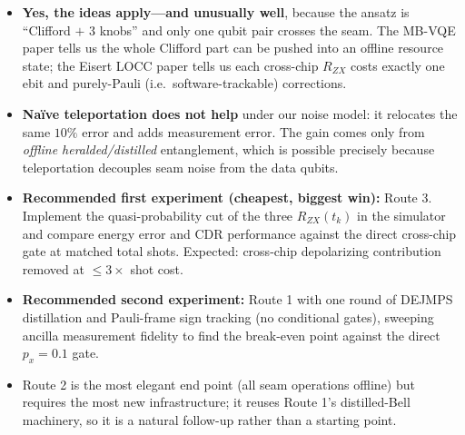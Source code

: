 \documentclass[11pt]{article}
\newcommand{\RZX}{R_{ZX}}
\begin{document}
\begin{itemize}[leftmargin=2em]
  \item \textbf{Yes, the ideas apply---and unusually well}, because the ansatz
        is ``Clifford $+$ 3 knobs'' and only one qubit pair crosses the seam.
        The MB-VQE paper tells us the whole Clifford part can be pushed into
        an offline resource state; the Eisert LOCC paper tells us each
        cross-chip $\RZX$ costs exactly one ebit and purely-Pauli
        (i.e.\ software-trackable) corrections.
  \item \textbf{Na\"ive teleportation does not help} under our noise model:
        it relocates the same $10\%$ error and adds measurement error. The
        gain comes only from \emph{offline heralded/distilled} entanglement,
        which is possible precisely because teleportation decouples seam
        noise from the data qubits.
  \item \textbf{Recommended first experiment (cheapest, biggest win):}
        Route 3. Implement the quasi-probability cut of the three
        $\RZX(t_k)$ in the simulator and compare energy error and CDR
        performance against the direct cross-chip gate at matched total
        shots. Expected: cross-chip depolarizing contribution removed at
        $\le 3\times$ shot cost.
  \item \textbf{Recommended second experiment:} Route 1 with one round of
        DEJMPS distillation and Pauli-frame sign tracking (no conditional
        gates), sweeping ancilla measurement fidelity to find the break-even
        point against the direct $p_x = 0.1$ gate.
  \item Route 2 is the most elegant end point (all seam operations offline)
        but requires the most new infrastructure; it reuses Route 1's
        distilled-Bell machinery, so it is a natural follow-up rather than a
        starting point.
\end{itemize}
\end{document}
